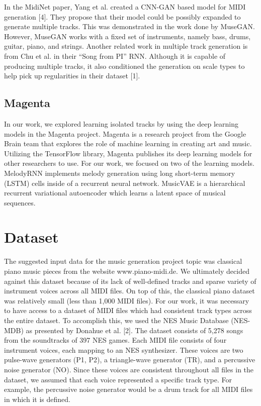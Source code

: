 \documentclass{article}
\begin{document}
In the MidiNet paper, Yang et al. created a CNN-GAN based model for MIDI generation [4]. They propose that their model could be possibly expanded to generate multiple tracks. This was demonstrated in the work done by MuseGAN. However, MuseGAN works with a fixed set of instruments, namely bass, drums, guitar, piano, and strings. Another related work in multiple track generation is from Chu et al. in their “Song from PI” RNN. Although it is capable of producing multiple tracks, it also conditioned the generation on scale types to help pick up regularities in their dataset [1].

\subsection{Magenta}

In our work, we explored learning isolated tracks by using the deep learning models in the Magenta project. Magenta is a research project from the Google Brain team that explores the role of machine learning in creating art and music. Utilizing the TensorFlow library, Magenta publishes its deep learning models for other researchers to use. For our work, we focused on two of the learning models. MelodyRNN implements melody generation using long short-term memory (LSTM) cells inside of a recurrent neural network. MusicVAE is a hierarchical recurrent variational autoencoder which learns a latent space of musical sequences.


\section{Dataset}

The suggested input data for the music generation project topic was classical piano music pieces from the website www.piano-midi.de. We ultimately decided against this dataset because of its lack of well-defined tracks and sparse variety of instrument voices across all MIDI files. On top of this, the classical piano dataset was relatively small (less than 1,000 MIDI files). For our work, it was necessary to have access to a dataset of MIDI files which had consistent track types across the entire dataset. To accomplish this, we used the NES Music Database (NES-MDB) as presented by Donahue et al. [2]. The dataset consists of 5,278 songs from the soundtracks of 397 NES games. Each MIDI file consists of four instrument voices, each mapping to an NES synthesizer. These voices are two pulse-wave generators (P1, P2), a triangle-wave generator (TR), and a percussive noise generator (NO). Since these voices are consistent throughout all files in the dataset, we assumed that each voice represented a specific track type. For example, the percussive noise generator would be a drum track for all MIDI files in which it is defined.
\end{document}
